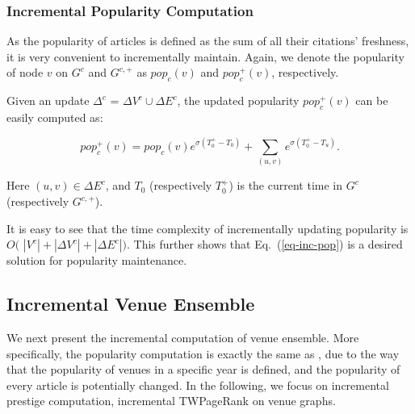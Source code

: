 {%

\subsubsection{Incremental Popularity Computation}

As the popularity of articles is defined as the sum of all their citations' freshness, it is very convenient to incrementally maintain. Again, we denote the popularity of node $v$ on $G^c$ and $G^{c,+}$ as $pop_c(v)$ and $pop_c^+(v)$, respectively.

Given an update $\Delta^c$ = $\Delta V^c\cup\Delta E^c$, the updated popularity $pop_{c}^+(v)$ can be easily computed as:
\begin{small}
\begin{equation}\label{eq-inc-pop}
pop_c^+(v) = pop_c(v) {e^{\sigma (T^+_0-T_0)}} + \sum_{(u,v)} {e^{\sigma (T^+_0-T_u)}}.
\end{equation}
\end{small}

\vspace{-1ex}
\noindent
Here $(u,v)\in \Delta E^c$, and $T_0$ (respectively $T^+_0$) is the current time in $G^c$ (respectively $G^{c,+}$).


It is easy to see that the time complexity of incrementally updating popularity is $O($ $|V^c|+|\Delta V^c|+|\Delta E^c|)$. This further shows that Eq.~(\ref{eq-inc-pop}) is a desired solution for popularity maintenance.

\subsection{Incremental Venue Ensemble}
\label{subsec-inc-venue}

We next present the incremental computation of venue ensemble.
More specifically, the popularity computation is exactly the same as \batensemble, due to the way that the  popularity of venues in a specific year is defined, and the popularity of every article is potentially changed.
In the following, we focus on incremental prestige computation, \ie incremental TWPageRank on venue graphs.

}
